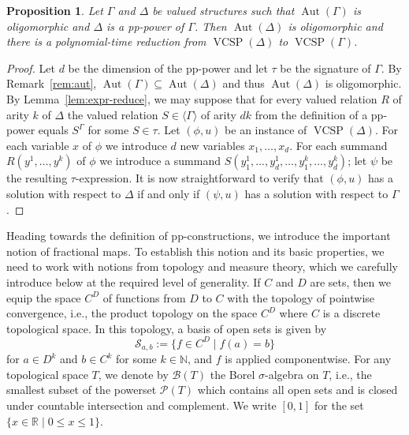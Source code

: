 \documentclass[nonacm]{acmart}
\DeclareMathOperator{\Aut}{Aut}
\DeclareMathOperator{\VCSP}{VCSP}
\newtheorem{proposition}[theorem]{Proposition}
\begin{document}
\begin{proposition}\label{prop:pp-hard}
Let $\Gamma$ and $\Delta$ be valued structures such that $\Aut(\Gamma)$ is oligomorphic and $\Delta$ is a pp-power of $\Gamma$. Then $\Aut(\Delta)$ is oligomorphic and 
there is a polynomial-time reduction from 
$\VCSP(\Delta)$ to $\VCSP(\Gamma)$. 
\end{proposition}
\begin{proof}
Let $d$ be the dimension of the pp-power
and let $\tau$ be the signature of $\Gamma$.
By Remark~\ref{rem:aut}, $\Aut(\Gamma) \subseteq \Aut(\Delta)$ and thus $\Aut(\Delta)$ is oligomorphic.
By Lemma~\ref{lem:expr-reduce}, we may suppose that for every valued relation $R$ of arity $k$ of $\Delta$ the valued relation $S \in \langle \Gamma \rangle$ of arity $dk$ from the definition of a pp-power equals $S^{\Gamma}$ for some $S \in \tau$. 
Let $(\phi,u)$ be an instance of $\VCSP(\Delta)$. 
For each variable $x$ of $\phi$ we introduce $d$ new variables $x_1,\dots,x_d$. 
For each summand $R(y^1,\dots,y^k)$ of $\phi$ we introduce a summand 
$S(y^1_1,\dots,y^1_d,\dots,y^k_1,\dots,y^k_d)$;
let $\psi$ be the resulting $\tau$-expression. 
It is now straightforward to verify that $(\phi,u)$ has a solution with respect to $\Delta$ if and only if $(\psi,u)$ has a solution with respect to $\Gamma$. 
\end{proof}


Heading towards the definition of pp-constructions, we introduce the important notion of fractional maps. To establish this notion and its basic properties, we need to work with notions from topology and measure theory, which we carefully introduce below at the required level of generality. If $C$ and $D$ are sets,
then we equip the space $C^D$ of functions from $D$ to $C$ with the topology of pointwise convergence, i.e., the product topology on the space $C^D$ where $C$ is a discrete topological space. 
In this topology, a basis of open sets is given by
$${\mathscr S}_{a,b} := \{f \in C^D \mid f(a)=b\}$$
for $a \in D^k$ and $b \in C^k$ for some $k \in {\mathbb N}$, and $f$ is applied componentwise.
For any topological space $T$, we denote by $\mathcal{B}(T)$
the Borel $\sigma$-algebra on $T$, i.e., the smallest subset of the powerset ${\mathcal P}(T)$ which contains all open sets and is closed under countable intersection and complement. We write $[0,1]$ for the set $\{x \in {\mathbb R} \mid 0 \leq x \leq 1\}$.
\end{document}
